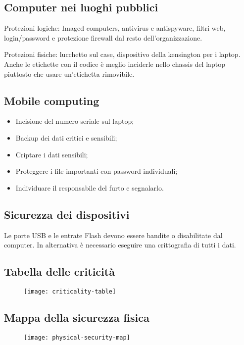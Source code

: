 \subsection{Computer nei luoghi pubblici}

Protezioni logiche: Imaged computers, antivirus e antispyware, filtri web,
login/password e protezione firewall dal resto dell'organizzazione.

Protezioni fisiche: lucchetto sul case, dispositivo della kensington per i
laptop. Anche le etichette con il codice è meglio inciderle nello chassis del
laptop piuttosto che usare un'etichetta rimovibile.

\subsection{Mobile computing}

\begin{itemize}
\item Incisione del numero seriale sul laptop;
\item Backup dei dati critici e sensibili;
\item Criptare i dati sensibili;
\item Proteggere i file importanti con password individuali;
\item Individuare il responsabile del furto e segnalarlo.
\end{itemize}


\subsection{Sicurezza dei dispositivi}

Le porte USB e le entrate Flash devono essere bandite o disabilitate dal
computer. In alternativa è necessario eseguire una crittografia di tutti i dati.


\subsection{Tabella delle criticità}

\begin{figure}[H]
 \centering
 \texttt{[image: criticality-table]}
\end{figure}

\subsection{Mappa della sicurezza fisica}
\begin{figure}[H]
 \centering
 \texttt{[image: physical-security-map]}
\end{figure}

